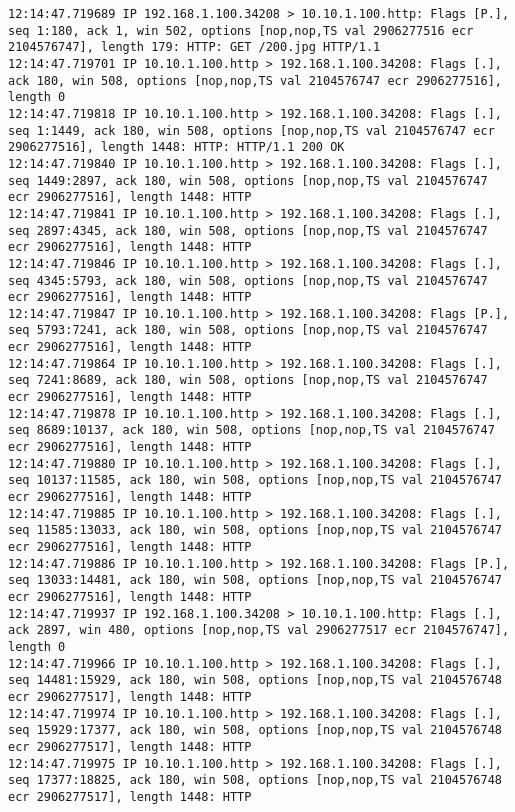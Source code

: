 \documentclass{article}
\begin{document}
{\begin{lstlisting}
12:14:47.719689 IP 192.168.1.100.34208 > 10.10.1.100.http: Flags [P.], seq 1:180, ack 1, win 502, options [nop,nop,TS val 2906277516 ecr 2104576747], length 179: HTTP: GET /200.jpg HTTP/1.1
12:14:47.719701 IP 10.10.1.100.http > 192.168.1.100.34208: Flags [.], ack 180, win 508, options [nop,nop,TS val 2104576747 ecr 2906277516], length 0
12:14:47.719818 IP 10.10.1.100.http > 192.168.1.100.34208: Flags [.], seq 1:1449, ack 180, win 508, options [nop,nop,TS val 2104576747 ecr 2906277516], length 1448: HTTP: HTTP/1.1 200 OK
12:14:47.719840 IP 10.10.1.100.http > 192.168.1.100.34208: Flags [.], seq 1449:2897, ack 180, win 508, options [nop,nop,TS val 2104576747 ecr 2906277516], length 1448: HTTP
12:14:47.719841 IP 10.10.1.100.http > 192.168.1.100.34208: Flags [.], seq 2897:4345, ack 180, win 508, options [nop,nop,TS val 2104576747 ecr 2906277516], length 1448: HTTP
12:14:47.719846 IP 10.10.1.100.http > 192.168.1.100.34208: Flags [.], seq 4345:5793, ack 180, win 508, options [nop,nop,TS val 2104576747 ecr 2906277516], length 1448: HTTP
12:14:47.719847 IP 10.10.1.100.http > 192.168.1.100.34208: Flags [P.], seq 5793:7241, ack 180, win 508, options [nop,nop,TS val 2104576747 ecr 2906277516], length 1448: HTTP
12:14:47.719864 IP 10.10.1.100.http > 192.168.1.100.34208: Flags [.], seq 7241:8689, ack 180, win 508, options [nop,nop,TS val 2104576747 ecr 2906277516], length 1448: HTTP
12:14:47.719878 IP 10.10.1.100.http > 192.168.1.100.34208: Flags [.], seq 8689:10137, ack 180, win 508, options [nop,nop,TS val 2104576747 ecr 2906277516], length 1448: HTTP
12:14:47.719880 IP 10.10.1.100.http > 192.168.1.100.34208: Flags [.], seq 10137:11585, ack 180, win 508, options [nop,nop,TS val 2104576747 ecr 2906277516], length 1448: HTTP
12:14:47.719885 IP 10.10.1.100.http > 192.168.1.100.34208: Flags [.], seq 11585:13033, ack 180, win 508, options [nop,nop,TS val 2104576747 ecr 2906277516], length 1448: HTTP
12:14:47.719886 IP 10.10.1.100.http > 192.168.1.100.34208: Flags [P.], seq 13033:14481, ack 180, win 508, options [nop,nop,TS val 2104576747 ecr 2906277516], length 1448: HTTP
12:14:47.719937 IP 192.168.1.100.34208 > 10.10.1.100.http: Flags [.], ack 2897, win 480, options [nop,nop,TS val 2906277517 ecr 2104576747], length 0
12:14:47.719966 IP 10.10.1.100.http > 192.168.1.100.34208: Flags [.], seq 14481:15929, ack 180, win 508, options [nop,nop,TS val 2104576748 ecr 2906277517], length 1448: HTTP
12:14:47.719974 IP 10.10.1.100.http > 192.168.1.100.34208: Flags [.], seq 15929:17377, ack 180, win 508, options [nop,nop,TS val 2104576748 ecr 2906277517], length 1448: HTTP
12:14:47.719975 IP 10.10.1.100.http > 192.168.1.100.34208: Flags [.], seq 17377:18825, ack 180, win 508, options [nop,nop,TS val 2104576748 ecr 2906277517], length 1448: HTTP

\end{lstlisting}}
\end{document}
